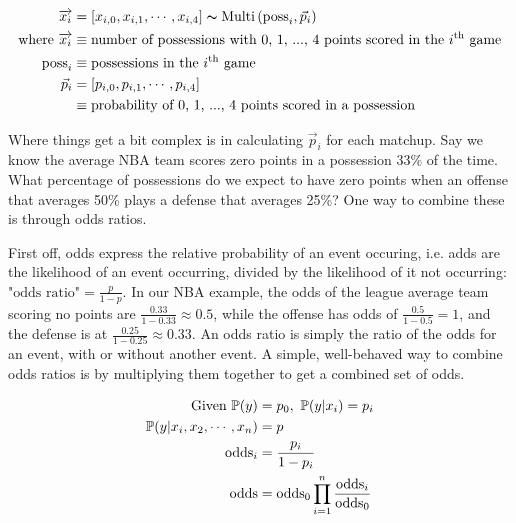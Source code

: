 \documentclass[12 pt]{article}
\begin{document}
\begin{flushleft}
\begin{align}
\overrightarrow{x_i} &= [x_{i,0}, x_{i,1}, \cdots, x_{i,4}] \thicksim \text{Multi} \left( \text{poss}_i, \vec{p}_i \right) \notag \\
\text{where } \overrightarrow{x_i} &\equiv \text{number of possessions with 0, 1, ..., 4 points scored in the }i^\text{th} \text{ game} \notag \\
\text{poss}_i &\equiv \text{possessions in the }i^\text{th} \text{ game} \notag \\
\vec{p}_i &= [p_{i,0}, p_{i, 1}, \cdots, p_{i,4}] \notag \\
&\equiv \text{probability of 0, 1, ..., 4 points scored in a possession} \notag
\end{align}

Where things get a bit complex is in calculating $ \vec{p}_i $ for each matchup.
Say we know the average NBA team scores zero points in a possession 33\% of the time.
What percentage of possessions do we expect to have zero points when an offense that averages 50\% plays a defense that averages 25\%?
One way to combine these is through odds ratios.

\vspace{5mm}

First off, odds express the relative probability of an event occuring, i.e. adds are the likelihood of an event occurring, divided by the likelihood of it not occurring: $ \text{"odds ratio"} = \frac{p}{1 - p} $.
In our NBA example, the odds of the league average team scoring no points are $ \frac{0.33}{1 - 0.33} \approx 0.5 $, while the offense has odds of $ \frac{0.5}{1 - 0.5} = 1 $, and the defense is at $ \frac{0.25}{1 - 0.25} \approx 0.33 $.
An odds ratio is simply the ratio of the odds for an event, with or without another event. 
A simple, well-behaved way to combine odds ratios is by multiplying them together to get a combined set of odds.

\begin{align}
\text{Given } \mathbb{P}(y) &= p_0, \text{ } \mathbb{P}(y|x_i) = p_i \notag \\
\mathbb{P}(y|x_i, x_2, \cdots, x_n) &= p \notag \\
\text{odds}_i &= \frac{p_i}{1 - p_i} \notag \\
\text{odds} &= \text{odds}_0 \prod_{i=1}^{n} \frac{\text{odds}_i}{\text{odds}_0} \notag
\end{align}


\end{flushleft}
\end{document}
